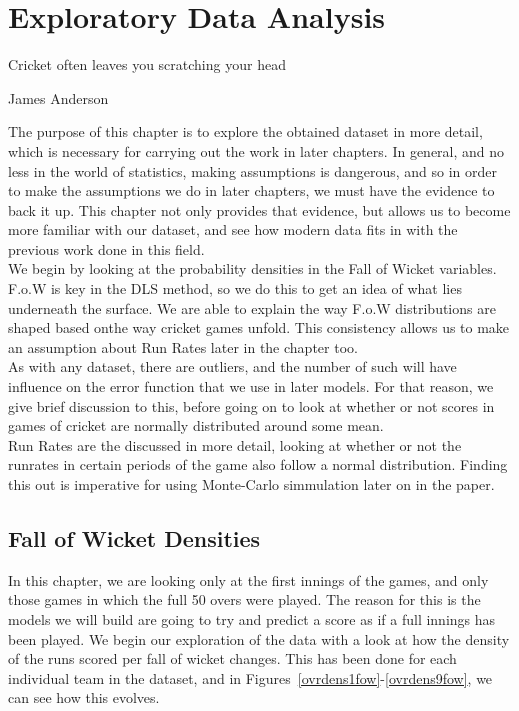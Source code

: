 \chapter{Exploratory Data Analysis}

\epigraph{Cricket often leaves you scratching your head}{James Anderson}

The purpose of this chapter is to explore the obtained dataset in more detail, which is necessary for carrying out the work in later chapters. In general, and no less
in the world of statistics, making assumptions is dangerous, and so in order to make the assumptions we do in later chapters, we must have the evidence to back it up.
This chapter not only provides that evidence, but allows us to become more familiar with our dataset, and see how modern data fits in with the previous work done in this 
field. \\
We begin by looking at the probability densities in the Fall of Wicket variables. F.o.W is key in the DLS method, so we do this to get an idea of what lies underneath the
surface. We are able to explain the way F.o.W distributions are shaped based onthe way cricket games unfold. This consistency allows us to make an assumption about Run Rates
later in the chapter too. \\
As with any dataset, there are outliers, and the number of such will have influence on the error function that we use in later models. For that reason, we give brief discussion 
to this, before going on to look at whether or not scores in games of cricket are normally distributed around some mean. \\
Run Rates are the discussed in more detail, looking at whether or not the runrates in certain periods of the game also follow a normal distribution. Finding this out is imperative
for using Monte-Carlo simmulation later on in the paper.

\section{Fall of Wicket Densities}

In this chapter, we are looking only at the first innings of the games, and only those games in which the full 50 overs were played. The 
reason for this is the models we will build are going to try and predict a score as if a full innings has been played. We begin our exploration of the data with a look at how the density of the runs scored per fall of wicket changes. This has been done for each
individual team in the dataset, and in Figures~\ref{ovrdens1fow}-\ref{ovrdens9fow}, we can see how this evolves.  

